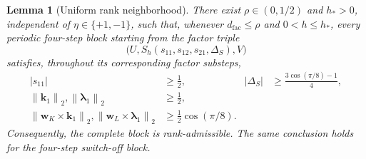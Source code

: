 \documentclass[10pt,a4paper]{amsart}
\numberwithin{equation}{section}
\newtheorem{lemma}[theorem]{Lemma}
\newcommand{\norm}[1]{\left\lVert #1\right\rVert}
\begin{document}
\begin{lemma}[Uniform rank neighborhood]
\label{lem:desingularized-rank-neighborhood}
There exist \(\rho\in(0,1/2)\) and \(h_*>0\), independent of
\(\eta\in\{+1,-1\}\), such that, whenever \(d_{\mathrm{fac}}\le\rho\) and
\(0<h\le h_*\), every periodic four-step block starting from the factor
triple
\[
 \bigl(U,S_h(s_{11},s_{12},s_{21},\Delta_S),V\bigr)
\]
satisfies, throughout its corresponding factor substeps,
\begin{equation}\label{eq:appendix-uniform-denominators}
\begin{aligned}
 |s_{11}|&\ge\frac12,
 &|\Delta_S|&\ge\frac{3\cos(\pi/8)-1}{4},\\
 \norm{\boldsymbol k_1}_2,\norm{\boldsymbol\lambda_1}_2
 &\ge\frac12,\\
 \norm{\boldsymbol w_K\times\boldsymbol k_1}_2,
 \norm{\boldsymbol w_L\times\boldsymbol\lambda_1}_2
 &\ge\frac12\cos(\pi/8).
\end{aligned}
\end{equation}
Consequently, the complete block is rank-admissible.  The same
conclusion holds for the four-step switch-off block.
\end{lemma}
\end{document}
